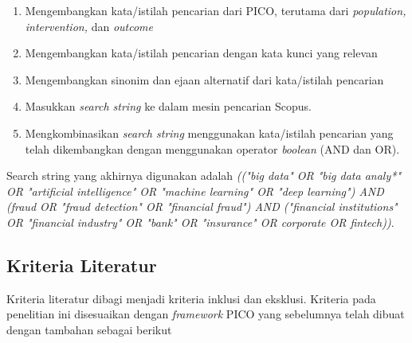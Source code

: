 \documentclass[12pt, a4paper]{article}
\begin{document}
\begin{enumerate}
    \setlength{\itemsep}{0pt}
    \item Mengembangkan  kata/istilah  pencarian  dari  PICO,  terutama  dari \textit{population, intervention,} dan \textit{outcome}
    \item Mengembangkan kata/istilah pencarian dengan kata kunci yang relevan
    \item Mengembangkan sinonim dan ejaan alternatif dari kata/istilah pencarian
    \item Masukkan \textit{search string} ke dalam mesin pencarian Scopus.
    \item Mengkombinasikan \textit{search string} menggunakan   kata/istilah   pencarian   yang   telah dikembangkan dengan menggunakan 
    operator \textit{boolean} (AND dan OR).
\end{enumerate}

Search string yang akhirnya digunakan adalah 
\textit{(("big data" OR "big data analy*" OR "artificial intelligence" OR "machine learning" OR "deep learning") 
AND (fraud OR "fraud detection" OR "financial fraud") AND ("financial institutions" OR "financial industry" 
OR "bank" OR "insurance" OR corporate OR fintech))}.

\subsection*{Kriteria Literatur}
\hspace{1cm}Kriteria literatur dibagi menjadi kriteria inklusi dan eksklusi. Kriteria pada penelitian ini disesuaikan
dengan \textit{framework} PICO yang sebelumnya telah dibuat dengan tambahan sebagai berikut
\end{document}
